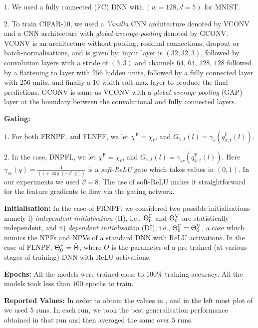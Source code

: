 \begin{appendix}
$1.$ We used a fully connected (FC) DNN with $(w=128,d=5)$ for MNIST. 

$2.$ To train CIFAR-10, we used a \emph{Vanilla} CNN architecture denoted by VCONV and a CNN architecture with \emph{global-average-pooling} denoted by GCONV. VCONV is an architecture without pooling, residual connections, dropout or batch-normalisations, and is given by: input layer is $(32, 32, 3)$, followed by convolution layers with a stride of $(3, 3)$ and channels $64$, $64$, $128$, $128$ followed by a flattening to layer with $256$ hidden units, followed by a fully connected layer with $256$ units, and finally a  $10$ width soft-max layer to produce the final predictions. GCONV is same as VCONV with a \emph{global-average-pooling} (GAP) layer at the boundary between the convolutional and fully connected layers.

\textbf{Gating:} 

$1.$ For both FRNPF, and FLNPF, we let $\chi^\text{F}=\chi_r$, and $G_{x,t}(l)= \gamma_{r}\left(q^\text{F}_{x,t}(l)\right)$.

$2.$ In the case, DNPFL, we let $\chi^\text{F}=\chi_r$, and $G_{x,t}(l)= \gamma_{sr}\left(q^\text{F}_{x,t}(l)\right)$. Here $\gamma_{sr}(q)=\frac{1}{(1+\exp(-\beta \cdot q))}$ is a \emph{soft-ReLU} gate which takes values in $(0,1)$. In our experiments we used $\beta=8$. The use of soft-ReLU makes it straightforward for the feature gradients to flow via the gating network.

\textbf{Initialisation:} In the case of FRNPF, we considered two possible initialisations namely i) \emph{independent initialisation} (II), i.e., ${\Theta}^{\text{F}}_0$ and ${\Theta}^{\text{V}}_0$ are statistically independent, and ii) \emph{dependent initialisation} (DI), i.e., ${\Theta}^{\text{F}}_0={\Theta}^{\text{V}}_0$, a case which mimics the NPFs and NPVs of a standard DNN with ReLU activations. In the case of FLNPF, ${\Theta}^{\text{F}}_0=\bar{\Theta}$, where $\bar{\Theta}$ is the parameter of a pre-trained (at various stages of training) DNN with ReLU activations. 

\textbf{Epochs:} All the models were trained close to $100\%$ training accuracy. All the models took less than $100$ epochs to train. 

\textbf{Reported Values:} In order to obtain the values in , and in the left most plot of  we used $5$ runs. In each run, we took the best generalisation performance obtained in that run and then averaged the same over $5$ runs.



\end{appendix}
